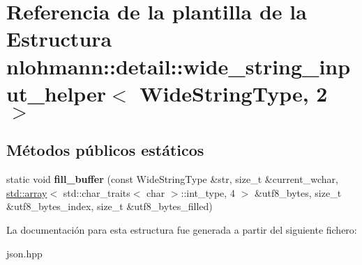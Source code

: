 \hypertarget{structnlohmann_1_1detail_1_1wide__string__input__helper_3_01WideStringType_00_012_01_4}{}\section{Referencia de la plantilla de la Estructura nlohmann\+:\+:detail\+:\+:wide\+\_\+string\+\_\+input\+\_\+helper$<$ Wide\+String\+Type, 2 $>$}
\label{structnlohmann_1_1detail_1_1wide__string__input__helper_3_01WideStringType_00_012_01_4}
\subsection*{Métodos públicos estáticos}
\begin{DoxyCompactItemize}
\item 
\mbox{\label{structnlohmann_1_1detail_1_1wide__string__input__helper_3_01WideStringType_00_012_01_4_a7ede7749f186f1a6a46c08abb607fd5c}} 
static void {\bfseries fill\+\_\+buffer} (const Wide\+String\+Type \&str, size\+\_\+t \&current\+\_\+wchar, \mbox{\hyperlink{namespacenlohmann_1_1detail_a1ed8fc6239da25abcaf681d30ace4985af1f713c9e000f5d3f280adbd124df4f5}{std\+::array}}$<$ std\+::char\+\_\+traits$<$ char $>$\+::int\+\_\+type, 4 $>$ \&utf8\+\_\+bytes, size\+\_\+t \&utf8\+\_\+bytes\+\_\+index, size\+\_\+t \&utf8\+\_\+bytes\+\_\+filled)
\end{DoxyCompactItemize}


La documentación para esta estructura fue generada a partir del siguiente fichero\+:\begin{DoxyCompactItemize}
\item 
json.\+hpp\end{DoxyCompactItemize}
